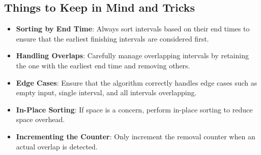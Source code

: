 \subsection*{Things to Keep in Mind and Tricks}
\begin{itemize}
    \item \textbf{Sorting by End Time}: Always sort intervals based on their end times to ensure that the earliest finishing intervals are considered first.
    
    \item \textbf{Handling Overlaps}: Carefully manage overlapping intervals by retaining the one with the earliest end time and removing others.
    
    \item \textbf{Edge Cases}: Ensure that the algorithm correctly handles edge cases such as empty input, single interval, and all intervals overlapping.
    
    \item \textbf{In-Place Sorting}: If space is a concern, perform in-place sorting to reduce space overhead.
    
    \item \textbf{Incrementing the Counter}: Only increment the removal counter when an actual overlap is detected.
\end{itemize}

